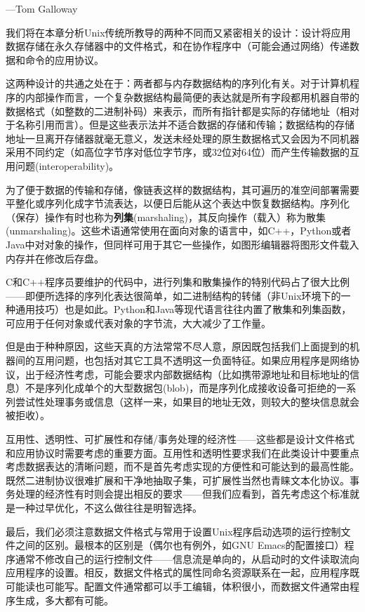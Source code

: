 \documentclass[12pt,oneside]{book}
\begin{document}
\begin{common-format}
\begin{flushright}
\begin{notecard}{27em}
{\hfill —Tom Galloway}
\end{notecard}
\end{flushright}


我们将在本章分析Unix传统所教导的两种不同而又紧密相关的设计：设计将应用数据存储在永久存储器中的文件格式，和在协作程序中（可能会通过网络）传递数据和命令的应用协议。

这两种设计的共通之处在于：两者都与内存数据结构的序列化有关。对于计算机程序的内部操作而言，一个复杂数据结构最简便的表达就是所有字段都用机器自带的数据格式（如整数的二进制补码）来表示，而所有指针都是实际的存储地址（相对于名称引用而言）。但是这些表示法并不适合数据的存储和传输；数据结构的存储地址一旦离开存储器就毫无意义，发送未经处理的原生数据格式又会因为不同机器采用不同约定（如高位字节序对低位字节序，或32位对64位）而产生传输数据的互用问题(interoperability)。

为了便于数据的传输和存储，像链表这样的数据结构，其可遍历的准空间部署需要平整化或序列化成字节流表达，以便日后能从这个表达中恢复数据结构。序列化（保存）操作有时也称为\textbf{列集}(marshaling)，其反向操作（载入）称为散集(unmarshaling)。这些术语通常使用在面向对象的语言中，如C++，Python或者Java中对对象的操作，但同样可用于其它一些操作，如图形编辑器将图形文件载入内存并在修改后存盘。

C和C++程序员要维护的代码中，进行列集和散集操作的特别代码占了很大比例——即便所选择的序列化表达很简单，如二进制结构的转储（非Unix环境下的一种通用技巧）也是如此。Python和Java等现代语言往往内置了散集和列集函数，可应用于任何对象或代表对象的字节流，大大减少了工作量。

但是由于种种原因，这些天真的方法常常不尽人意，原因既包括我们上面提到的机器间的互用问题，也包括对其它工具不透明这一负面特征。如果应用程序是网络协议，出于经济性考虑，可能会要求内部数据结构（比如携带源地址和目标地址的信息）不是序列化成单个的大型数据包(blob)，而是序列化成接收设备可拒绝的一系列尝试性处理事务或信息（这样一来，如果目的地址无效，则较大的整块信息就会被拒收）。

互用性、透明性、可扩展性和存储/事务处理的经济性——这些都是设计文件格式和应用协议时需要考虑的重要方面。互用性和透明性要求我们在此类设计中要重点考虑数据表达的清晰问题，而不是首先考虑实现的方便性和可能达到的最高性能。既然二进制协议很难扩展和干净地抽取子集，可扩展性当然也青睐文本化协议。事务处理的经济性有时则会提出相反的要求——但我们应看到，首先考虑这个标准就是一种过早优化，不这么做往往是明智选择。

最后，我们必须注意数据文件格式与常用于设置Unix程序启动选项的运行控制文件之间的区别。最根本的区别是（偶尔也有例外，如GNU Emacs的配置接口）程序通常不修改自己的运行控制文件——信息流是单向的，从启动时的文件读取流向应用程序的设置。相反，数据文件格式的属性同命名资源联系在一起，应用程序既可能读也可能写。配置文件通常都可以手工编辑，体积很小，而数据文件通常由程序生成，多大都有可能。


\end{common-format}
\end{document}
